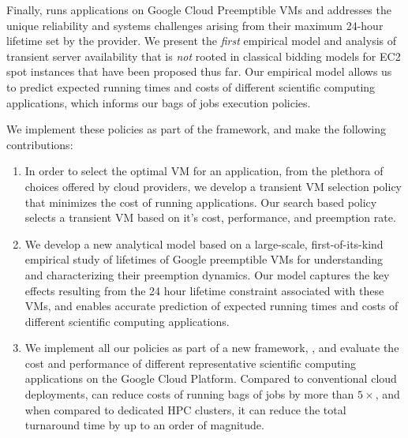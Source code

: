 Finally, \sysname runs applications on Google Cloud Preemptible VMs and addresses the unique reliability and systems challenges arising from their maximum 24-hour lifetime set by the provider.
We present the \emph{first} empirical model and analysis of transient server availability that is \emph{not} rooted in classical bidding models for EC2 spot instances that have been proposed thus far. Our empirical model allows us to predict expected running times and costs of different scientific computing applications, which informs our bags of jobs execution policies.

We implement these policies as part of the \sysname framework, and make the following contributions:
\begin{enumerate}[leftmargin=12pt]
\item In order to select the optimal VM for an application, from the plethora of choices offered by cloud providers, we develop a transient VM selection policy that minimizes the cost of running applications. Our search based policy selects a transient VM based on it's cost, performance, and preemption rate. 

  
\item We develop a new analytical model based on a large-scale, first-of-its-kind empirical study of lifetimes of Google preemptible VMs for understanding and characterizing their preemption dynamics. Our model captures the key effects resulting from the 24 hour lifetime constraint associated with these VMs, and enables accurate prediction of expected running times and costs of different scientific computing applications.
  
\item We implement all our policies as part of a new framework, \sysname, and evaluate the cost and performance of different representative scientific computing  applications on the Google Cloud Platform. Compared to conventional cloud deployments, \sysname can reduce costs of running bags of jobs by more than $5\times$, and when compared to dedicated HPC clusters, it can reduce the total turnaround time by up to an order of magnitude. 

\end{enumerate}

